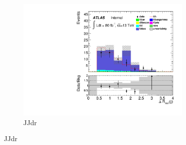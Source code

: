 \begin{figure}[h]
\begin{subfigure}[b]{0.45\textwidth}
 \includegraphics[width=0.95\textwidth,angle=-90]{fig/lowBDTOSFakes/jjdrmin_1l2tau_F.pdf}
 \caption{JJdr}
\end{subfigure}
\end{figure}
